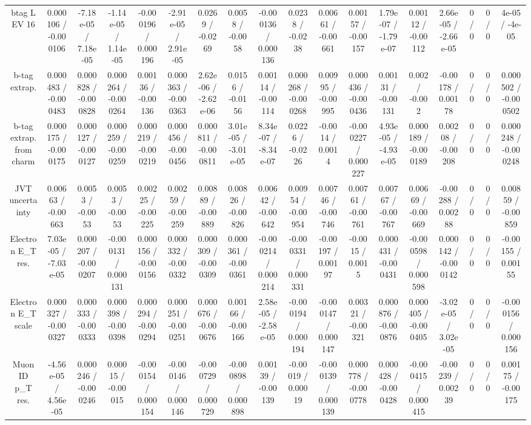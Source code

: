 \documentclass[10pt]{article}
\begin{document}
\begin{table}[htbp]
\begin{center}
\begin{tabular}{|c|c|c|c|c|c|c|c|c|c|c|c|c|c|c|c|c|c|}
  btag L EV 16 & 0.000106 / -0.000106 & -7.18e-05 / 7.18e-05 & -1.14e-05 / 1.14e-05 & -0.000196 / 0.000196 & -2.91e-05 / 2.91e-05 & 0.0269 / -0.0269 & 0.0058 / -0.0058 & -0.000136 / 0.000136 & 0.0238 / -0.0238 & 0.00661 / -0.00661 & 0.00157 / -0.00157 & 1.79e-07 / -1.79e-07 & 0.00112 / -0.00112 & 2.66e-05 / -2.66e-05 & 0 / 0 & 0 / 0 & 4e-05 / -4e-05 \\ 
  b-tag extrap. & 0.000483 / -0.000483 & 0.000828 / -0.000828 & 0.000264 / -0.000264 & 0.00136 / -0.00136 & 0.000363 / -0.000363 & 2.62e-06 / -2.62e-06 & 0.0156 / -0.0156 & 0.00114 / -0.00114 & 0.000268 / -0.000268 & 0.00995 / -0.00995 & 0.000436 / -0.000436 & 0.00131 / -0.00131 & 0.002 / -0.002 & -0.00178 / 0.00178 & 0 / 0 & 0 / 0 & 0.000502 / -0.000502 \\ 
  b-tag extrap. from charm & 0.000175 / -0.000175 & 0.000127 / -0.000127 & 0.000259 / -0.000259 & 0.000219 / -0.000219 & 0.000456 / -0.000456 & 0.000811 / -0.000811 & 3.01e-05 / -3.01e-05 & 8.34e-07 / -8.34e-07 & 0.0226 / -0.0226 & -0.0014 / 0.0014 & -0.000227 / 0.000227 & 4.93e-05 / -4.93e-05 & 0.000189 / -0.000189 & 0.00208 / -0.00208 & 0 / 0 & 0 / 0 & 0.000248 / -0.000248 \\ 
  JVT uncertainty & 0.00663 / -0.00663 & 0.0053 / -0.0053 & 0.0053 / -0.0053 & 0.00225 / -0.00225 & 0.00259 / -0.00259 & 0.00889 / -0.00889 & 0.00826 / -0.00826 & 0.00642 / -0.00642 & 0.00954 / -0.00954 & 0.00746 / -0.00746 & 0.00761 / -0.00761 & 0.00767 / -0.00767 & 0.00669 / -0.00669 & -0.00288 / 0.00288 & 0 / 0 & 0 / 0 & 0.00859 / -0.00859 \\ 
  Electron E_{T} res. & 7.03e-05 / -7.03e-05 & 0.000207 / -0.000207 & -0.000131 / 0.000131 & 0.000156 / -0.000156 & 0.000332 / -0.000332 & 0.000309 / -0.000309 & 0.000361 / -0.000361 & -0.000214 / 0.000214 & -0.000331 / 0.000331 & -0.00197 / 0.00197 & -0.0015 / 0.0015 & 0.000431 / -0.000431 & -0.000598 / 0.000598 & 0.000142 / -0.000142 & 0 / 0 & 0 / 0 & -0.00155 / 0.00155 \\ 
  Electron E_{T} scale & 0.000327 / -0.000327 & 0.000333 / -0.000333 & 0.000398 / -0.000398 & 0.000294 / -0.000294 & 0.000251 / -0.000251 & 0.000676 / -0.000676 & 0.00166 / -0.00166 & 2.58e-05 / -2.58e-05 & -0.000194 / 0.000194 & -0.000147 / 0.000147 & 0.00321 / -0.00321 & 0.000876 / -0.000876 & 0.000405 / -0.000405 & -3.02e-05 / 3.02e-05 & 0 / 0 & 0 / 0 & -0.000156 / 0.000156 \\ 
  Muon ID p_{T} res. & -4.56e-05 / 4.56e-05 & 0.000246 / -0.000246 & 0.00015 / -0.00015 & -0.000154 / 0.000154 & -0.000146 / 0.000146 & -0.000729 / 0.000729 & -0.000898 / 0.000898 & 0.00139 / -0.00139 & -0.00019 / 0.00019 & -0.000139 / 0.000139 & 0.000778 / -0.000778 & 0.000428 / -0.000428 & -0.000415 / 0.000415 & -0.00239 / 0.00239 & 0 / 0 & 0 / 0 & 0.00175 / -0.00175 \\ 

\end{tabular}
\end{center}
\end{table}
\end{document}
